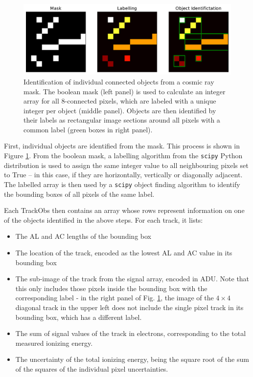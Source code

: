 \documentclass[a4paper, 11pt]{article}
\begin{document}
\begin{figure}
  \centering
  \includegraphics[width=\textwidth]{images/TrackObs_Objects}
  \caption{Identification of individual connected objects from a cosmic ray mask. The boolean mask (left panel) is used to calculate an integer array for all 8-connected pixels, which are labeled with a unique integer per object (middle panel). Objects are then identified by their labels as rectangular image sections around all pixels with a common label (green boxes in right panel).}
  \label{fig:TrackObs_Objects}
\end{figure}

First, individual objects are identified from the mask. This process is shown in Figure \ref{fig:TrackObs_Objects}. From the boolean mask, a labelling algorithm from the \texttt{scipy} Python distribution is used to assign the same integer value to all neighbouring pixels set to True -- in this case, if they are horizontally, vertically or diagonally adjacent. The labelled array is then used by a \texttt{scipy} object finding algorithm to identify the bounding boxes of all pixels of the same label.

Each TrackObs then contains an array whose rows represent information on one of the objects identified in the above steps. For each track, it lists:
\begin{itemize}
  \item The AL and AC lengths of the bounding box
  \item The location of the track, encoded as the lowest AL and AC value in its bounding box
  \item The sub-image of the track from the signal array, encoded in ADU. Note that this only includes those pixels inside the bounding box with the corresponding label - in the right panel of Fig. \ref{fig:TrackObs_Objects}, the image of the $4 \times 4$ diagonal track in the upper left does not include the single pixel track in its bounding box, which has a different label.
  \item The sum of signal values of the track in electrons, corresponding to the total measured ionizing energy.
  \item The uncertainty of the total ionizing energy, being the square root of the sum of the squares of the individual pixel uncertainties.
\end{itemize}
\end{document}
